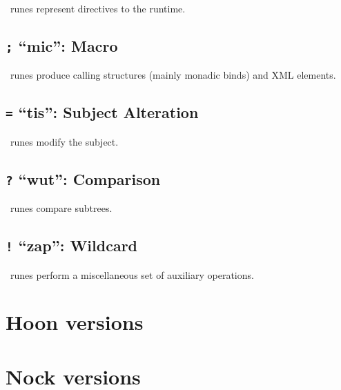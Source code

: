 \psig~runes represent directives to the runtime.

\subsection{\texttt{;} “mic”:  Macro}

\mic~runes produce calling structures (mainly monadic binds) and XML elements.

\subsection{\texttt{=} “tis”:  Subject Alteration}

\tis~runes modify the subject.

\subsection{\texttt{?} “wut”:  Comparison}

\wut~runes compare subtrees.

\subsection{\texttt{!} “zap”:  Wildcard}

\zap~runes perform a miscellaneous set of auxiliary operations.

\section{Hoon versions}


\section{Nock versions}

